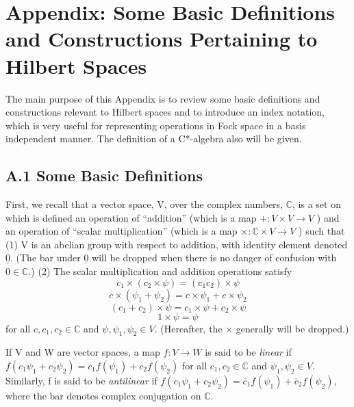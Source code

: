 \documentclass[11pt,a4paper]{article}
\begin{document}
\clearpage
\hypertarget{source-201}{}
\section*{Appendix: Some Basic Definitions and Constructions Pertaining to Hilbert Spaces}

The main purpose of this Appendix is to review some basic definitions and constructions relevant to Hilbert spaces and to introduce an index notation, which is very useful for representing operations in Fock space in a basis independent manner. The definition of a C*-algebra also will be given.

\subsection*{A.1 Some Basic Definitions}\hypertarget{sec:A.1}{}

First, we recall that a vector space, V, over the complex numbers, \(\mathbb{C}\), is a set on which is defined an operation of ``addition'' (which is a map \(+: V \times V \to V\) ) and an operation of ``scalar multiplication'' (which is a map \(\times: \mathbb{C} \times V \to V\) ) such that (1) V is an abelian group with respect to addition, with identity element denoted \(\underline{0}\). (The bar under \(\underline{0}\) will be dropped when there is no danger of confusion with \(0 \in \mathbb{C}\).) (2) The scalar multiplication and addition operations satisfy
\begin{equation*}
c_{1} \times (c_{2} \times \psi) = (c_{1} c_{2}) \times \psi \tag{A.1.1}\label{eq:A.1.1}
\end{equation*}
\begin{equation*}
c\times(\psi_1+\psi_2)=c\times\psi_1+c\times\psi_2 \tag{A.1.2}\label{eq:A.1.2}
\end{equation*}
\begin{equation*}
(c_1+c_2)\times\psi=c_1\times\psi+c_2\times\psi \tag{A.1.3}\label{eq:A.1.3}
\end{equation*}
\begin{equation*}
1\times\psi = \psi \tag{A.1.4}\label{eq:A.1.4}
\end{equation*}
for all \(c,c_1,c_2\in\mathbb{C}\) and \(\psi,\psi_1,\psi_2\in V\). (Hereafter, the \(\times\) generally will be dropped.)

If V and W are vector spaces, a map \(f:V \to W\) is said to be \emph{linear} if \(f(c_1\psi_1+c_2\psi_2)=c_1f(\psi_1)+c_2f(\psi_2)\) for all \(c_1,c_2\in \mathbb{C}\) and \(\psi_1,\psi_2\in V\). Similarly, f is said to be \emph{antilinear} if \(f(c_1\psi_1+c_2\psi_2)=\overline{c}_1f(\psi_1)+\overline{c}_2f(\psi_2)\), where the bar denotes complex conjugation on \(\mathbb{C}\).
\end{document}
